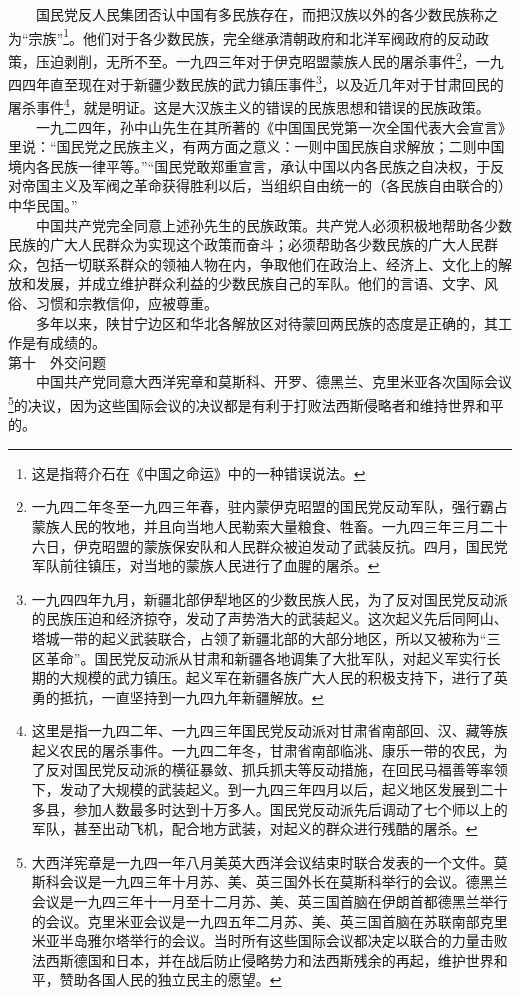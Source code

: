 \documentclass[cn,11pt,chinese]{elegantbook}
\begin{document}
　　国民党反人民集团否认中国有多民族存在，而把汉族以外的各少数民族称之为“宗族”\footnote[23]{  这是指蒋介石在《中国之命运》中的一种错误说法。}。他们对于各少数民族，完全继承清朝政府和北洋军阀政府的反动政策，压迫剥削，无所不至。一九四三年对于伊克昭盟蒙族人民的屠杀事件\footnote[24]{ 一九四二年冬至一九四三年春，驻内蒙伊克昭盟的国民党反动军队，强行霸占蒙族人民的牧地，并且向当地人民勒索大量粮食、牲畜。一九四三年三月二十六日，伊克昭盟的蒙族保安队和人民群众被迫发动了武装反抗。四月，国民党军队前往镇压，对当地的蒙族人民进行了血腥的屠杀。}，一九四四年直至现在对于新疆少数民族的武力镇压事件\footnote[25]{ 一九四四年九月，新疆北部伊犁地区的少数民族人民，为了反对国民党反动派的民族压迫和经济掠夺，发动了声势浩大的武装起义。这次起义先后同阿山、塔城一带的起义武装联合，占领了新疆北部的大部分地区，所以又被称为“三区革命”。国民党反动派从甘肃和新疆各地调集了大批军队，对起义军实行长期的大规模的武力镇压。起义军在新疆各族广大人民的积极支持下，进行了英勇的抵抗，一直坚持到一九四九年新疆解放。}，以及近几年对于甘肃回民的屠杀事件\footnote[26]{ 这里是指一九四二年、一九四三年国民党反动派对甘肃省南部回、汉、藏等族起义农民的屠杀事件。一九四二年冬，甘肃省南部临洮、康乐一带的农民，为了反对国民党反动派的横征暴敛、抓兵抓夫等反动措施，在回民马福善等率领下，发动了大规模的武装起义。到一九四三年四月以后，起义地区发展到二十多县，参加人数最多时达到十万多人。国民党反动派先后调动了七个师以上的军队，甚至出动飞机，配合地方武装，对起义的群众进行残酷的屠杀。}，就是明证。这是大汉族主义的错误的民族思想和错误的民族政策。\\
　　一九二四年，孙中山先生在其所著的《中国国民党第一次全国代表大会宣言》里说：“国民党之民族主义，有两方面之意义：一则中国民族自求解放；二则中国境内各民族一律平等。”“国民党敢郑重宣言，承认中国以内各民族之自决权，于反对帝国主义及军阀之革命获得胜利以后，当组织自由统一的（各民族自由联合的）中华民国。”\\
　　中国共产党完全同意上述孙先生的民族政策。共产党人必须积极地帮助各少数民族的广大人民群众为实现这个政策而奋斗；必须帮助各少数民族的广大人民群众，包括一切联系群众的领袖人物在内，争取他们在政治上、经济上、文化上的解放和发展，并成立维护群众利益的少数民族自己的军队。他们的言语、文字、风俗、习惯和宗教信仰，应被尊重。\\
　　多年以来，陕甘宁边区和华北各解放区对待蒙回两民族的态度是正确的，其工作是有成绩的。\\
第十　外交问题\\
　　中国共产党同意大西洋宪章和莫斯科、开罗、德黑兰、克里米亚各次国际会议\footnote[27]{ 大西洋宪章是一九四一年八月美英大西洋会议结束时联合发表的一个文件。莫斯科会议是一九四三年十月苏、美、英三国外长在莫斯科举行的会议。德黑兰会议是一九四三年十一月至十二月苏、美、英三国首脑在伊朗首都德黑兰举行的会议。克里米亚会议是一九四五年二月苏、美、英三国首脑在苏联南部克里米亚半岛雅尔塔举行的会议。当时所有这些国际会议都决定以联合的力量击败法西斯德国和日本，并在战后防止侵略势力和法西斯残余的再起，维护世界和平，赞助各国人民的独立民主的愿望。}的决议，因为这些国际会议的决议都是有利于打败法西斯侵略者和维持世界和平的。\\
\end{document}
